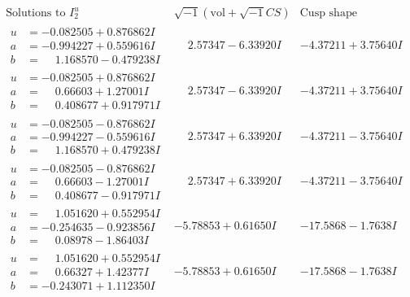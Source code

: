 \documentclass[1p]{elsarticle_modified}
\theoremstyle{definition}
\newcommand{\I}{\sqrt{-1}}
\begin{document}
$$\begin{array}{c|c|c}  
\text{Solutions to }I^u_{2}& \I (\text{vol} + \sqrt{-1}CS) & \text{Cusp shape}\\
 \hline 
\begin{aligned}
u &= -0.082505 + 0.876862 I \\
a &= -0.994227 + 0.559616 I \\
b &= \phantom{-}1.168570 - 0.479238 I\end{aligned}
 & \phantom{-}2.57347 - 6.33920 I & -4.37211 + 3.75640 I \\ \hline\begin{aligned}
u &= -0.082505 + 0.876862 I \\
a &= \phantom{-}0.66603 + 1.27001 I \\
b &= \phantom{-}0.408677 + 0.917971 I\end{aligned}
 & \phantom{-}2.57347 - 6.33920 I & -4.37211 + 3.75640 I \\ \hline\begin{aligned}
u &= -0.082505 - 0.876862 I \\
a &= -0.994227 - 0.559616 I \\
b &= \phantom{-}1.168570 + 0.479238 I\end{aligned}
 & \phantom{-}2.57347 + 6.33920 I & -4.37211 - 3.75640 I \\ \hline\begin{aligned}
u &= -0.082505 - 0.876862 I \\
a &= \phantom{-}0.66603 - 1.27001 I \\
b &= \phantom{-}0.408677 - 0.917971 I\end{aligned}
 & \phantom{-}2.57347 + 6.33920 I & -4.37211 - 3.75640 I \\ \hline\begin{aligned}
u &= \phantom{-}1.051620 + 0.552954 I \\
a &= -0.254635 - 0.923856 I \\
b &= \phantom{-}0.08978 - 1.86403 I\end{aligned}
 & -5.78853 + 0.61650 I & -17.5868 - 1.7638 I \\ \hline\begin{aligned}
u &= \phantom{-}1.051620 + 0.552954 I \\
a &= \phantom{-}0.66327 + 1.42377 I \\
b &= -0.243071 + 1.112350 I\end{aligned}
 & -5.78853 + 0.61650 I & -17.5868 - 1.7638 I \\ \hline\begin{aligned}

\end{aligned}
\end{array}$$
\end{document}
